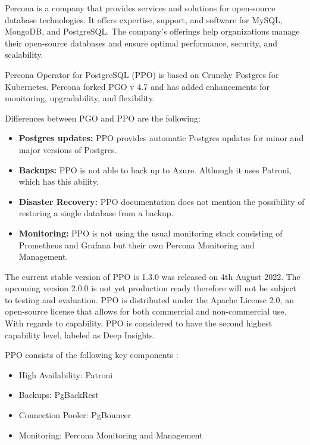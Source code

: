 
\pagebreak
{}
Percona is a company that provides services and solutions for open-source database technologies. It offers expertise, support, and software for MySQL, MongoDB, and PostgreSQL. The company's offerings help organizations manage their open-source databases and ensure optimal performance, security, and scalability. \cite{Percona}

Percona Operator for PostgreSQL (PPO) is based on Crunchy Postgres for Kubernetes. Percona forked PGO v 4.7 and has added enhancements for monitoring, upgradability, and flexibility. \cite{PerconaBlogProsAndCons}

Differences between PGO and PPO are the following:
\begin{itemize}
  \item \textbf{Postgres updates:} PPO provides automatic Postgres updates for minor and major versions of Postgres.  \cite{PerconaDocuUpdate}
  \item \textbf{Backups:} PPO is not able to back up to Azure. \cite{PerconaDocuCompare} Although it uses Patroni, which has this ability.
  \item \textbf{Disaster Recovery:} PPO documentation does not mention the possibility of restoring a single database from a backup. \cite{PerconaDocuBackups}
  \item \textbf{Monitoring:} PPO is not using the usual monitoring stack consisting of Prometheus and Grafana but their own Percona Monitoring and Management. \cite{PerconaDocuMonitoring}
\end{itemize}

The current stable version of PPO is 1.3.0 was released on 4th August 2022. The upcoming version 2.0.0 is not yet production ready therefore will not be subject to testing and evaluation. \cite{PerconaDocuV2} PPO is distributed under the Apache License 2.0, an open-source license that allows for both commercial and non-commercial use. With regards to capability, PPO is considered to have the second highest capability level, labeled as Deep Insights. \cite{OperatorHubPercona}

PPO consists of the following key components \cite{PostgresOnKubernetes}:
\begin{itemize}
  \item High Availability: Patroni
  \item Backups: PgBackRest
  \item Connection Pooler: PgBouncer
  \item Monitoring: Percona Monitoring and Management
\end{itemize}


